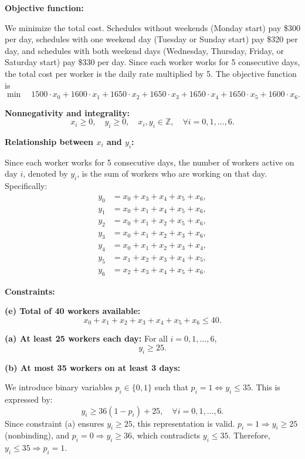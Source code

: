 \documentclass{article}
\begin{document}
\begin{enumerate}
\textbf{Objective function:}

We minimize the total cost. Schedules without weekends (Monday start) pay \$300 per day, schedules with one weekend day (Tuesday or Sunday start) pay \$320 per day, and schedules with both weekend days (Wednesday, Thursday, Friday, or Saturday start) pay \$330 per day. Since each worker works for 5 consecutive days, the total cost per worker is the daily rate multiplied by 5. The objective function is
\[
\min \quad 1500 \cdot x_0 + 1600 \cdot x_1 + 1650 \cdot x_2 + 1650 \cdot x_3 + 1650 \cdot x_4 + 1650 \cdot x_5 + 1600 \cdot x_6.
\]

\textbf{Nonnegativity and integrality:}
\[
x_i \geq 0, \quad y_i \geq 0, \quad x_i, y_i \in \mathbb{Z}, \quad \forall i = 0, 1, \ldots, 6.
\]

\textbf{Relationship between $x_i$ and $y_i$:}

Since each worker works for 5 consecutive days, the number of workers active on day $i$, denoted by $y_i$, is the sum of workers who are working on that day. Specifically:
\begin{align*}
y_0 &= x_0 + x_3 + x_4 + x_5 + x_6, \\
y_1 &= x_0 + x_1 + x_4 + x_5 + x_6, \\
y_2 &= x_0 + x_1 + x_2 + x_5 + x_6, \\
y_3 &= x_0 + x_1 + x_2 + x_3 + x_6, \\
y_4 &= x_0 + x_1 + x_2 + x_3 + x_4, \\
y_5 &= x_1 + x_2 + x_3 + x_4 + x_5, \\
y_6 &= x_2 + x_3 + x_4 + x_5 + x_6.
\end{align*}

\textbf{Constraints:}

\textbf{(e) Total of 40 workers available:}
\[
x_0 + x_1 + x_2 + x_3 + x_4 + x_5 + x_6 \leq 40.
\]

\textbf{(a) At least 25 workers each day:}
For all $i = 0, 1, \ldots, 6$,
\[
y_i \geq 25.
\]

\textbf{(b) At most 35 workers on at least 3 days:}

We introduce binary variables $p_i \in \{0,1\}$ such that $p_i = 1 \Leftrightarrow y_i \leq 35$. This is expressed by:
\[
y_i \geq 36(1-p_i) + 25, \quad \forall i = 0, 1, \ldots, 6.
\]
Since constraint (a) ensures $y_i \geq 25$, this representation is valid. $p_i = 1 \Rightarrow y_i \geq 25$ (nonbinding), and $p_i = 0 \Rightarrow y_i \geq 36$, which contradicts $y_i \leq 35$. Therefore, $y_i \leq 35 \Rightarrow p_i = 1$.


\end{enumerate}
\end{document}
